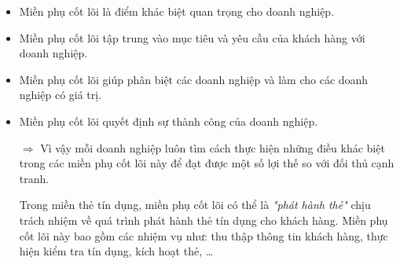 \begin{itemize}

\item Miền phụ cốt lõi là điểm khác biệt quan trọng cho doanh nghiệp.

\item Miền phụ cốt lõi tập trung vào mục tiêu và yêu cầu của khách hàng với doanh nghiệp.

\item Miền phụ cốt lõi giúp phân biệt các doanh nghiệp và làm cho các doanh nghiệp có giá trị.

\item Miền phụ cốt lõi quyết định sự thành công của doanh nghiệp.

$\Rightarrow$ Vì vậy mỗi doanh nghiệp luôn tìm cách thực hiện những điều khác biệt trong các miền phụ cốt lõi này để đạt được một số lợi thế so với đối thủ cạnh tranh.

\begin{example} Trong miền thẻ tín dụng, miền phụ cốt lõi có thể là \textit{"phát hành thẻ"} chịu trách nhiệm về quá trình phát hành thẻ tín dụng cho khách hàng. Miền phụ cốt lõi này bao gồm các nhiệm vụ như: thu thập thông tin khách hàng, thực hiện kiểm tra tín dụng, kích hoạt thẻ, \dots

\end{example}

\end{itemize}

